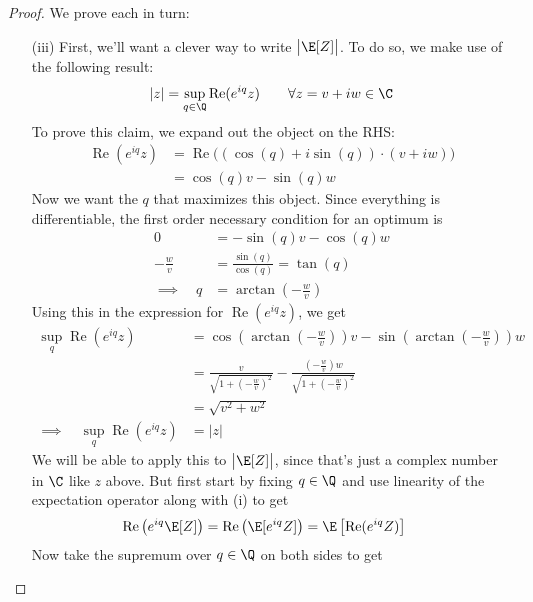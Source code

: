 \documentclass[12pt]{article}
\theoremstyle{plain}
\theoremstyle{definition}
\theoremstyle{remark}
\renewcommand{\Re}{\operatorname{Re}}
\begin{document}
\begin{proof}
We prove each in turn:
\begin{enumerate}
  \item[(iii)]
    First, we'll want a clever way to write $\big|\E[Z]\big|$. To do so,
    we make use of the following result:
    \begin{align}
      |z| = \sup_{q\in\Q} \Re(e^{iq}z)
      \qquad\forall z = v+iw\in\C
      \label{absvalz}
    \end{align}
    To prove this claim, we expand out the object on the RHS:
    \begin{align*}
      \Re(e^{iq}z)
      &= \Re\big(
      \left(\cos(q) + i\sin(q)\right)
      \cdot
      \left(v + iw\right)
      \big) \\
      &=\cos(q)v - \sin(q)w
    \end{align*}
    Now we want the $q$ that maximizes this object. Since everything is
    differentiable, the first order necessary condition for an optimum
    is
    \begin{align*}
      0 &=-\sin(q)v - \cos(q)w \\
      -\frac{w}{v} &=
      \frac{\sin(q)}{\cos(q)} = \tan(q) \\
      \implies\quad
      q &= \arctan\left(-\frac{w}{v}\right)
    \end{align*}
    Using this in the expression for $\Re(e^{iq}z)$, we get
    \begin{align*}
      \sup_q
      \Re(e^{iq}z)
      &=
      \cos\left(\arctan\left(-\frac{w}{v}\right)\right)v -
      \sin\left(\arctan\left(-\frac{w}{v}\right)\right)w \\
      &=
      \frac{v}{\sqrt{1+\left(-\frac{w}{v}\right)^2}}
      -
      \frac{\left(-\frac{w}{v}\right)w}{\sqrt{1+\left(-\frac{w}{v}\right)^2}}
      \\
      &= \sqrt{v^2+w^2} \\
      \implies\quad
      \sup_q
      \Re(e^{iq}z)
      &= |z|
    \end{align*}
    We will be able to apply this to $\big|\E[Z]\big|$, since that's
    just a complex number in $\C$ like $z$ above. But first start by
    fixing $q\in\Q$ and use linearity of the expectation operator along
    with (i) to get
    \begin{align*}
      \Re\left(e^{iq}\E[Z]\right)
      &= \Re\left(\E[e^{iq}Z]\right)
      = \E\left[\Re(e^{iq}Z)\right]
    \end{align*}
    Now take the supremum over $q\in\Q$ on both sides to get

\end{enumerate}
\end{proof}
\end{document}

